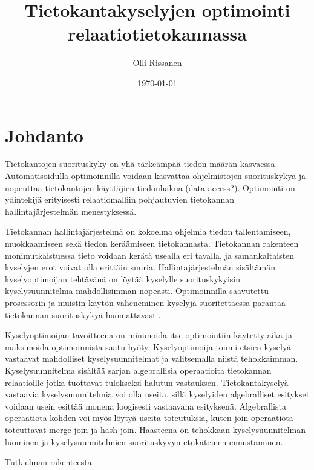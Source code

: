 \documentclass[finnish]{tktltiki2}
\title{Tietokantakyselyjen optimointi relaatiotietokannassa}
\author{Olli Rissanen}
\date{\today}
\theoremstyle{definition}
\theoremstyle{remark}
\begin{document}

\maketitle
\makeabstract
\tableofcontents
\newpage



\section{Johdanto}

Tietokantojen suorituskyky on yhä tärkeämpää tiedon määrän kasvaessa. Automatisoidulla optimoinnilla voidaan kasvattaa ohjelmistojen suorituskykyä ja nopeuttaa tietokantojen käyttäjien tiedonhakua (data-access?). Optimointi on ydintekijä erityisesti relaatiomalliin pohjautuvien tietokannan hallintajärjestelmän menestyksessä. 

Tietokannan hallintajärjestelmä on kokoelma ohjelmia tiedon tallentamiseen, muokkaamiseen sekä tiedon keräämiseen tietokannasta. Tietokannan rakenteen monimutkaistuessa tieto voidaan kerätä usealla eri tavalla, ja samankaltaisten kyselyjen erot voivat olla erittäin suuria. Hallintajärjestelmän sisältämän kyselyoptimoijan tehtävänä on löytää kyselylle suorituskykyisin kyselysuunnitelma mahdollisimman nopeasti. Optimoinnilla saavutettu prosessorin ja muistin käytön väheneminen kyselyjä suoritettaessa parantaa tietokannan suorituskykyä huomattavasti.

Kyselyoptimoijan tavoitteena on minimoida itse optimointiin käytetty aika ja maksimoida optimoinnista saatu hyöty. Kyselyoptimoija toimii etsien kyselyä vastaavat mahdolliset kyselysuunnitelmat ja valitsemalla niistä tehokkaimman. Kyselysuunnitelma sisältää sarjan algebrallisia operaatioita tietokannan relaatioille jotka tuottavat tulokseksi halutun vastauksen.  Tietokantakyselyä vastaavia kyselysuunnitelmia voi olla useita, sillä kyselyiden algebralliset esitykset voidaan usein esittää monena loogisesti vastaavana esityksenä. Algebrallista operaatiota kohden voi myös löytyä useita toteutuksia, kuten join-operaatiota toteuttavat merge join ja hash join.  Haasteena on tehokkaan kyselysuunnitelman luominen ja kyselysuunnitelmien suorituskyvyn etukäteinen ennustaminen. 

Tutkielman rakenteesta

%
%
\end{document}
